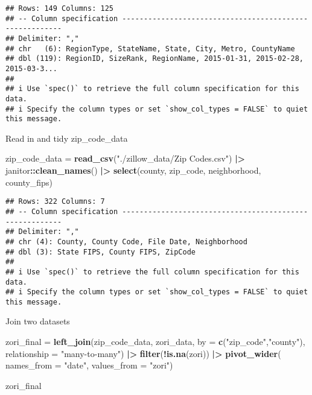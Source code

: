 \documentclass[
]{article}
\newenvironment{Shaded}{\begin{snugshade}}{\end{snugshade}}
\newcommand{\AttributeTok}[1]{\textcolor[rgb]{0.13,0.29,0.53}{#1}}
\newcommand{\FunctionTok}[1]{\textcolor[rgb]{0.13,0.29,0.53}{\textbf{#1}}}
\newcommand{\NormalTok}[1]{#1}
\newcommand{\OtherTok}[1]{\textcolor[rgb]{0.56,0.35,0.01}{#1}}
\newcommand{\SpecialCharTok}[1]{\textcolor[rgb]{0.81,0.36,0.00}{\textbf{#1}}}
\newcommand{\StringTok}[1]{\textcolor[rgb]{0.31,0.60,0.02}{#1}}
\begin{document}
\begin{verbatim}
## Rows: 149 Columns: 125
## -- Column specification --------------------------------------------------------
## Delimiter: ","
## chr   (6): RegionType, StateName, State, City, Metro, CountyName
## dbl (119): RegionID, SizeRank, RegionName, 2015-01-31, 2015-02-28, 2015-03-3...
## 
## i Use `spec()` to retrieve the full column specification for this data.
## i Specify the column types or set `show_col_types = FALSE` to quiet this message.
\end{verbatim}

Read in and tidy zip\_code\_data

\begin{Shaded}
\begin{Highlighting}[]
\NormalTok{zip\_code\_data }\OtherTok{=} 
  \FunctionTok{read\_csv}\NormalTok{(}\StringTok{"./zillow\_data/Zip Codes.csv"}\NormalTok{) }\SpecialCharTok{|\textgreater{}}
\NormalTok{  janitor}\SpecialCharTok{::}\FunctionTok{clean\_names}\NormalTok{() }\SpecialCharTok{|\textgreater{}}
  \FunctionTok{select}\NormalTok{(county, zip\_code, neighborhood, county\_fips)}
\end{Highlighting}
\end{Shaded}

\begin{verbatim}
## Rows: 322 Columns: 7
## -- Column specification --------------------------------------------------------
## Delimiter: ","
## chr (4): County, County Code, File Date, Neighborhood
## dbl (3): State FIPS, County FIPS, ZipCode
## 
## i Use `spec()` to retrieve the full column specification for this data.
## i Specify the column types or set `show_col_types = FALSE` to quiet this message.
\end{verbatim}

Join two datasets

\begin{Shaded}
\begin{Highlighting}[]
\NormalTok{zori\_final }\OtherTok{=} 
   \FunctionTok{left\_join}\NormalTok{(zip\_code\_data, zori\_data, }
             \AttributeTok{by =} \FunctionTok{c}\NormalTok{(}\StringTok{"zip\_code"}\NormalTok{,}\StringTok{"county"}\NormalTok{), }
             \AttributeTok{relationship =} \StringTok{"many{-}to{-}many"}\NormalTok{) }\SpecialCharTok{|\textgreater{}}
  \FunctionTok{filter}\NormalTok{(}\SpecialCharTok{!}\FunctionTok{is.na}\NormalTok{(zori)) }\SpecialCharTok{|\textgreater{}}
  \FunctionTok{pivot\_wider}\NormalTok{(}
    \AttributeTok{names\_from =} \StringTok{"date"}\NormalTok{,}
    \AttributeTok{values\_from =} \StringTok{"zori"}\NormalTok{)}

\NormalTok{zori\_final}
\end{Highlighting}
\end{Shaded}
\end{document}
